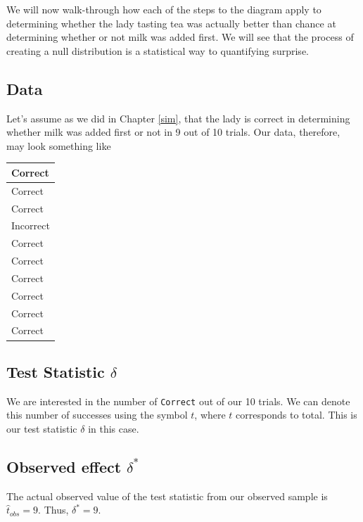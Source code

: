 \documentclass[]{tufte-book}
\begin{document}
We will now walk-through how each of the steps to the diagram apply to
determining whether the lady tasting tea was actually better than chance
at determining whether or not milk was added first. We will see that the
process of creating a null distribution is a statistical way to
quantifying surprise.

\subsection{Data}\label{data}

Let's assume as we did in Chapter \ref{sim}, that the lady is correct in
determining whether milk was added first or not in 9 out of 10 trials.
Our data, therefore, may look something like

\begin{tabular}{l}
\hline
Correct\\
\hline
Correct\\
\hline
Correct\\
\hline
Incorrect\\
\hline
Correct\\
\hline
Correct\\
\hline
Correct\\
\hline
Correct\\
\hline
Correct\\
\hline
Correct\\
\hline
\end{tabular}

\subsection{\texorpdfstring{Test Statistic
\(\delta\)}{Test Statistic \textbackslash{}delta}}\label{test-statistic-delta}

We are interested in the number of \texttt{Correct} out of our 10
trials. We can denote this number of successes using the symbol \(t\),
where \(t\) corresponds to total. This is our test statistic \(\delta\)
in this case.

\subsection{\texorpdfstring{Observed effect
\(\delta^*\)}{Observed effect \textbackslash{}delta\^{}*}}\label{observed-effect-delta}

The actual observed value of the test statistic from our observed sample
is \(\hat{t}_{obs} = 9\). Thus, \(\delta^* = 9\).
\end{document}
